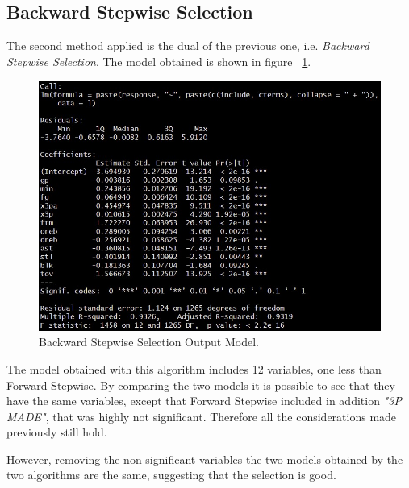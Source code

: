 \subsection{Backward Stepwise Selection}

The second method applied is the dual of the previous one, i.e. \textit{Backward Stepwise Selection}. The model obtained is shown in figure \Fig~\ref{fig:BackwardModelSummary}.
\begin{figure}[h]
	\centering
	\includegraphics[width=0.35\linewidth]{ImageFiles/Regression/Backward/BackwardModelSummary}
	\caption{Backward Stepwise Selection Output Model.}
	\label{fig:BackwardModelSummary}
\end{figure}

The model obtained with this algorithm includes 12 variables, one less than Forward Stepwise. By comparing the two models it is possible to see that they have the same variables, except that Forward Stepwise included in addition \textit{"3P MADE"}, that was highly not significant. Therefore all the considerations made previously still hold.

However, removing the non significant variables the two models obtained by the two algorithms are the same, suggesting that the selection is good.